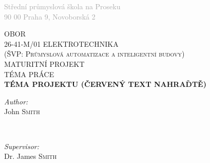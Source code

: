 \documentclass[12pt]{article} %
\begin{document}
\begin{titlepage}
\begin{minipage}{0.20\textwidth}
\end{minipage}
\begin{adjustbox}{minipage=0.6\textwidth,left}
	\textcolor{darkgray}{
	Střední průmyslová škola na Proseku\\
	90 00 Praha 9, Novoborská 2}
\end{adjustbox}
\vspace{1cm}

\center %


\textsc{\large OBOR}\\[0.5cm] %

\textsc{\large 26-41-M/01 ELEKTROTECHNIKA}\\
\textsc{\large (ŠVP: Průmyslová automatizace a inteligentní budovy)}\\[3cm]

\textsc{\LARGE MATURITNÍ PROJEKT}\\[1.5cm]

\textsc{TÉMA PRÁCE}\\[1.5cm]

{\color{red} \huge \bfseries  TÉMA PROJEKTU (ČERVENÝ TEXT NAHRAĎTĚ)} %

\newpage

\begin{minipage}{0.4\textwidth}
\begin{flushleft} \large
\emph{Author:}\\
John \textsc{Smith} %
\end{flushleft}
\end{minipage}
~
\begin{minipage}{0.4\textwidth}
\begin{flushright} \large
\emph{Supervisor:} \\
Dr. James \textsc{Smith} %
\end{flushright}
\end{minipage}\\[4cm]

\vfill %

\end{titlepage}


\tableofcontents %
\end{document}
